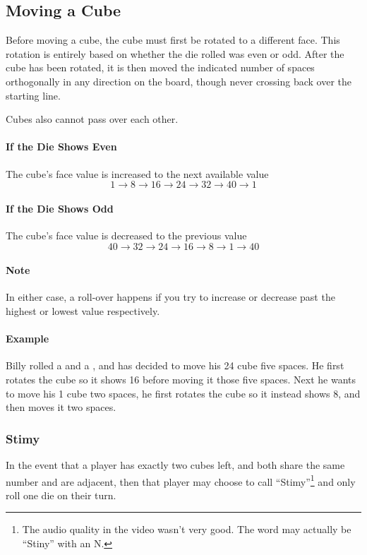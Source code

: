 \subsection{Moving a Cube}
Before moving a cube, the cube must first be rotated to a different face.
This rotation is entirely based on whether the die rolled was even or odd.
After the cube has been rotated, it is then moved the indicated number of spaces orthogonally in any direction on the board, though never crossing back over the starting line.

Cubes also cannot pass over each other.

\paragraph{If the Die Shows Even} The cube's face value is increased to the next available value
$$1 \to 8 \to 16 \to 24 \to 32 \to 40 \to 1$$
\paragraph{If the Die Shows Odd} The cube's face value is decreased to the previous value
$$40 \to 32 \to 24 \to 16 \to 8 \to 1 \to 40$$

\paragraph{Note} In either case, a roll-over happens if you try to increase or decrease past the highest or lowest value respectively.

\paragraph{Example} Billy rolled a  and a , and has decided to move his 24 cube five spaces. He first rotates the cube so it shows 16 before moving it those five spaces. Next he wants to move his 1 cube two spaces, he first rotates the cube so it instead shows 8, and then moves it two spaces.

\subsubsection{Stimy}
In the event that a player has exactly two cubes left, and both share the same number and are adjacent, then that player may choose to call ``Stimy''\footnote{The audio quality in the video wasn't very good. The word may actually be ``Stiny'' with an N.} and only roll one die on their turn.